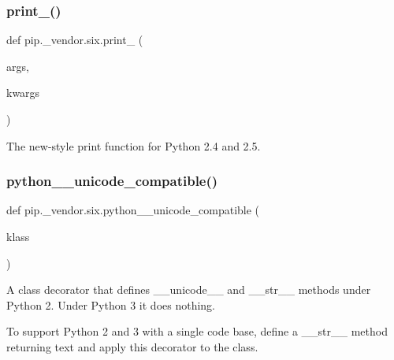 \mbox{\label{namespacepip_1_1__vendor_1_1six_aec57b90390e2de2103dc7fae7bfbea76}} 
\subsubsection{\texorpdfstring{print\+\_\+()}{print\_()}}
{\footnotesize\ttfamily def pip.\+\_\+vendor.\+six.\+print\+\_\+ (\begin{DoxyParamCaption}\item[{}]{args,  }\item[{}]{kwargs }\end{DoxyParamCaption})}

\begin{DoxyVerb}The new-style print function for Python 2.4 and 2.5.\end{DoxyVerb}
 \mbox{\label{namespacepip_1_1__vendor_1_1six_a73067039b6330b5c45e695487a314c41}} 
\subsubsection{\texorpdfstring{python\+\_\+\_\+unicode\+\_\+compatible()}{python\_2\_unicode\_compatible()}}
{\footnotesize\ttfamily def pip.\+\_\+vendor.\+six.\+python\+\_\+\_\+unicode\+\_\+compatible (\begin{DoxyParamCaption}\item[{}]{klass }\end{DoxyParamCaption})}

\begin{DoxyVerb}A class decorator that defines __unicode__ and __str__ methods under Python 2.
Under Python 3 it does nothing.

To support Python 2 and 3 with a single code base, define a __str__ method
returning text and apply this decorator to the class.
\end{DoxyVerb}
 \mbox{\label{namespacepip_1_1__vendor_1_1six_a5c5ed849179e1ac2761bdc10b2aa1706}} 
